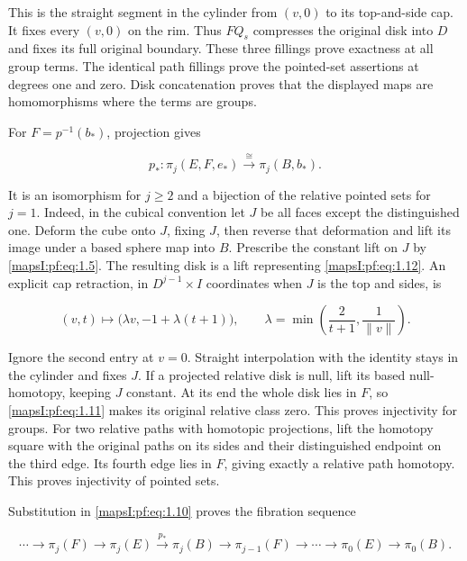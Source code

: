 This is the straight segment in the cylinder from \((v,0)\) to its top-and-side cap. It fixes every \((v,0)\) on the rim. Thus \(FQ_s\) compresses the original disk into \(D\) and fixes its full original boundary. These three fillings prove exactness at all group terms. The identical path fillings prove the pointed-set assertions at degrees one and zero. Disk concatenation proves that the displayed maps are homomorphisms where the terms are groups.

For \(F=p^{-1}(b_*)\), projection gives

\begin{equation}
p_*:\pi_j(E,F,e_*)\xrightarrow{\ \cong\ }\pi_j(B,b_*).
\label{mapsI:pf:eq:1.12}
\end{equation}

It is an isomorphism for \(j\geq2\) and a bijection of the relative pointed sets for \(j=1\). Indeed, in the cubical convention let \(J\) be all faces except the distinguished one. Deform the cube onto \(J\), fixing \(J\), then reverse that deformation and lift its image under a based sphere map into \(B\). Prescribe the constant lift on \(J\) by \eqref{mapsI:pf:eq:1.5}. The resulting disk is a lift representing \eqref{mapsI:pf:eq:1.12}. An explicit cap retraction, in \(D^{j-1}\times I\) coordinates when \(J\) is the top and sides, is

\begin{equation}
(v,t)\longmapsto\bigl(\lambda v,-1+\lambda(t+1)\bigr),
\qquad
\lambda=\min\left(\frac2{t+1},\frac1{\|v\|}\right).
\label{mapsI:pf:eq:1.13}
\end{equation}

Ignore the second entry at \(v=0\). Straight interpolation with the identity stays in the cylinder and fixes \(J\). If a projected relative disk is null, lift its based null-homotopy, keeping \(J\) constant. At its end the whole disk lies in \(F\), so \eqref{mapsI:pf:eq:1.11} makes its original relative class zero. This proves injectivity for groups. For two relative paths with homotopic projections, lift the homotopy square with the original paths on its sides and their distinguished endpoint on the third edge. Its fourth edge lies in \(F\), giving exactly a relative path homotopy. This proves injectivity of pointed sets.

Substitution in \eqref{mapsI:pf:eq:1.10} proves the fibration sequence

\begin{equation}
\cdots\to\pi_j(F)\to\pi_j(E)\xrightarrow{p_*}\pi_j(B)
\to\pi_{j-1}(F)\to\cdots\to\pi_0(E)\to\pi_0(B).
\label{mapsI:pf:eq:1.14}
\end{equation}

